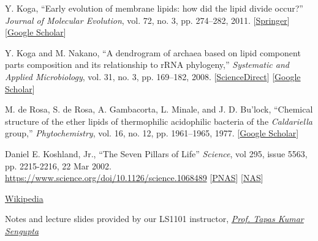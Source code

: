 \documentclass[11pt]{scrartcl}
\begin{document}
\begin{thebibliography}{}
			 Y. Koga, “Early evolution of membrane lipids: how did the lipid divide occur?” \emph{Journal of Molecular Evolution}, vol. 72, no. 3, pp. 274–282, 2011. [\href{https://link.springer.com/article/10.1007/s00239-011-9428-5}{Springer}] [\href{https://scholar.google.com/scholar_lookup?title=Early%20evolution%20of%20membrane%20lipids:%20how%20did%20the%20lipid%20divide%20occur?&author=Y.%20Koga&publication_year=2011}{Google Scholar}]
			
			 Y. Koga and M. Nakano, “A dendrogram of archaea based on lipid component parts composition and its relationship to rRNA phylogeny,” \emph{Systematic and Applied Microbiology}, vol. 31, no. 3, pp. 169–182, 2008. [\href{https://www.sciencedirect.com/science/article/abs/pii/S0723202008000246?via%3Dihub}{ScienceDirect}] [\href{https://scholar.google.com/scholar_lookup?title=A%20dendrogram%20of%20archaea%20based%20on%20lipid%20component%20parts%20composition%20and%20its%20relationship%20to%20rRNA%20phylogeny&author=Y.%20Koga%20&author=M.%20Nakano&publication_year=2008}{Google Scholar}]
			
			 M. de Rosa, S. de Rosa, A. Gambacorta, L. Minale, and J. D. Bu'lock, “Chemical structure of the ether lipids of thermophilic acidophilic bacteria of the \emph{Caldariella} group,” \emph{Phytochemistry}, vol. 16, no. 12, pp. 1961–1965, 1977. [\href{https://scholar.google.com/scholar_lookup?title=Chemical%20structure%20of%20the%20ether%20lipids%20of%20thermophilic%20acidophilic%20bacteria%20of%20the%20Caldariella%20group&author=M.%20de%20Rosa&author=S.%20de%20Rosa&author=A.%20Gambacorta&author=L.%20Minale&author=&author=J.%20D.%20Bu%27lock&publication_year=1977}{Google Scholar}]
			
			 Daniel E. Koshland, Jr., ``The Seven Pillars of Life'' \emph{Science}, vol 295, issue 5563, pp. 2215-2216, 22 Mar 2002. \url{https://www.science.org/doi/10.1126/science.1068489} [\href{https://www.pnas.org/doi/full/10.1073/pnas.0707644104}{PNAS}] [\href{http://nasonline.org/member-directory/deceased-members/53659.html}{NAS}] 
			
			 \href{https://www.wikipedia.org/}{Wikipedia}
			
			 Notes and lecture slides provided by our LS1101 instructor, \emph{\href{mailto:senguptk@iiserkol.ac.in}{Prof. Tapas Kumar Sengupta}}
		\end{thebibliography}		
\end{document}
